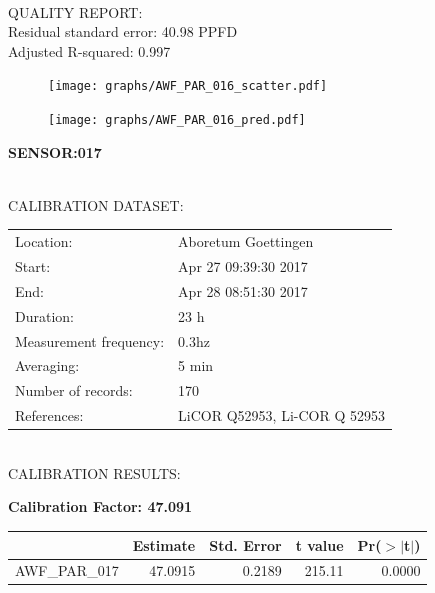 \documentclass[oneside]{report}
\begin{document}
\hrulefill\\
QUALITY REPORT:\\
Residual standard error: 40.98 PPFD\\
Adjusted R-squared: 0.997



\begin{figure}[H]
  \centering
  \texttt{[image: graphs/AWF\_PAR\_016\_scatter.pdf]}
\end{figure}




\begin{figure}[H]
  \centering
  \texttt{[image: graphs/AWF\_PAR\_016\_pred.pdf]}
\end{figure}

\pagebreak


\begin{center}
\large{\textbf{SENSOR:017}}\\
\end{center}

\hrulefill\\
CALIBRATION DATASET:\\
\begin{table}[h!]
  \centering
  \label{tab:table1}
  \begin{tabular}{ll}
    Location: & Aboretum Goettingen\\ 
    
    
    Start:  & Apr 27 09:39:30 2017 \\
    End:   & Apr 28 08:51:30 2017\\ 
    Duration: & 23 h\\
    Measurement frequency: & 0.3hz\\
    Averaging:  &5 min\\
    Number of records: & 170 \\
    References: & LiCOR Q52953, Li-COR Q 52953 \\
  \end{tabular}
\end{table}

\hrulefill\\
CALIBRATION RESULTS:\\


\begin{center}
\textbf{\large{Calibration Factor: 47.091}}\\
\end{center}
\begin{table}[ht]
\centering
\begin{tabular}{rrrrr}
  \hline
 & Estimate & Std. Error & t value & Pr($>$$|$t$|$) \\ 
  \hline
AWF\_PAR\_017 & 47.0915 & 0.2189 & 215.11 & 0.0000 \\ 
   \hline
\end{tabular}
\end{table}
\end{document}
